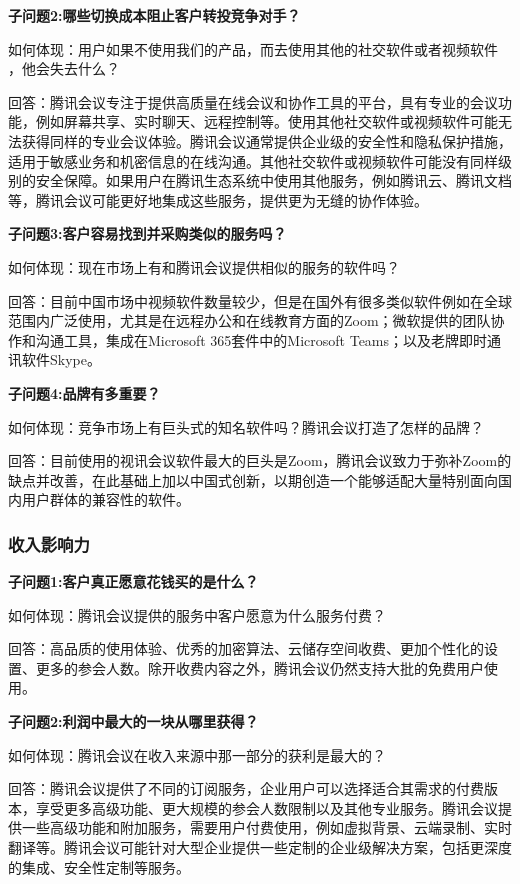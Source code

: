 \documentclass[a4paper,12pt]{article}
\begin{document}
    \textbf{子问题2:哪些切换成本阻止客户转投竞争对手？}

    如何体现：⽤户如果不使⽤我们的产品，⽽去使⽤其他的社交软件或者视频软件 ，他会失去什么？

    回答：腾讯会议专注于提供高质量在线会议和协作工具的平台，具有专业的会议功能，例如屏幕共享、实时聊天、远程控制等。使用其他社交软件或视频软件可能无法获得同样的专业会议体验。腾讯会议通常提供企业级的安全性和隐私保护措施，适用于敏感业务和机密信息的在线沟通。其他社交软件或视频软件可能没有同样级别的安全保障。如果用户在腾讯生态系统中使用其他服务，例如腾讯云、腾讯文档等，腾讯会议可能更好地集成这些服务，提供更为无缝的协作体验。


    \textbf{子问题3:客户容易找到并采购类似的服务吗？}

    如何体现：现在市场上有和腾讯会议提供相似的服务的软件吗？

    回答：目前中国市场中视频软件数量较少，但是在国外有很多类似软件例如在全球范围内广泛使用，尤其是在远程办公和在线教育方面的Zoom；微软提供的团队协作和沟通工具，集成在Microsoft 365套件中的Microsoft Teams；以及老牌即时通讯软件Skype。

    \textbf{子问题4:品牌有多重要？}

    如何体现：竞争市场上有巨头式的知名软件吗？腾讯会议打造了怎样的品牌？

    回答：⽬前使⽤的视讯会议软件最⼤的巨头是Zoom，腾讯会议致⼒于弥补Zoom的缺点并改善，在此基础上加以中国式创新，以期创造⼀个能够适配⼤量特别面向国内⽤户群体的兼容性的软件。

    \subsubsection{收入影响力}
    \textbf{子问题1:客户真正愿意花钱买的是什么？}

    如何体现：腾讯会议提供的服务中客户愿意为什么服务付费？

    回答：⾼品质的使⽤体验、优秀的加密算法、云储存空间收费、更加个性化的设置、更多的参会⼈数。除开收费内容之外，腾讯会议仍然支持⼤批的免费⽤户使⽤。
    
    \textbf{子问题2:利润中最大的一块从哪里获得？}

    如何体现：腾讯会议在收⼊来源中那⼀部分的获利是最⼤的？

    回答：腾讯会议提供了不同的订阅服务，企业用户可以选择适合其需求的付费版本，享受更多高级功能、更大规模的参会人数限制以及其他专业服务。腾讯会议提供一些高级功能和附加服务，需要用户付费使用，例如虚拟背景、云端录制、实时翻译等。腾讯会议可能针对大型企业提供一些定制的企业级解决方案，包括更深度的集成、安全性定制等服务。
    
\end{document}
